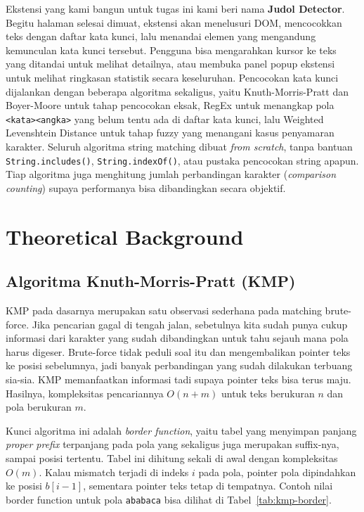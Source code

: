\documentclass[11pt,a4paper]{article}
\begin{document}
Ekstensi yang kami bangun untuk tugas ini kami beri nama \textbf{Judol Detector}. Begitu halaman selesai dimuat, ekstensi akan
menelusuri DOM, mencocokkan teks dengan daftar kata kunci, lalu menandai elemen yang mengandung kemunculan kata kunci tersebut.
Pengguna bisa mengarahkan kursor ke teks yang ditandai untuk melihat detailnya, atau membuka panel popup ekstensi untuk melihat
ringkasan statistik secara keseluruhan. Pencocokan kata kunci dijalankan dengan beberapa algoritma sekaligus, yaitu Knuth-Morris-Pratt
dan Boyer-Moore untuk tahap pencocokan eksak, RegEx untuk menangkap pola \texttt{<kata><angka>} yang belum tentu ada di daftar kata kunci,
lalu Weighted Levenshtein Distance untuk tahap fuzzy yang menangani kasus penyamaran karakter. Seluruh algoritma string matching
dibuat \textit{from scratch}, tanpa bantuan \texttt{String.includes()}, \texttt{String.indexOf()}, atau pustaka pencocokan string apapun.
Tiap algoritma juga menghitung jumlah perbandingan karakter (\textit{comparison counting}) supaya performanya bisa dibandingkan secara
objektif.

\newpage
\section{Theoretical Background}

\subsection{Algoritma Knuth-Morris-Pratt (KMP)}
KMP pada dasarnya merupakan satu observasi sederhana pada matching brute-force. Jika pencarian gagal di tengah jalan, sebetulnya kita
sudah punya cukup informasi dari karakter yang sudah dibandingkan untuk tahu sejauh mana pola harus digeser. Brute-force tidak
peduli soal itu dan mengembalikan pointer teks ke posisi sebelumnya, jadi banyak perbandingan yang sudah dilakukan terbuang sia-sia.
KMP memanfaatkan informasi tadi supaya pointer teks bisa terus maju. Hasilnya, kompleksitas pencariannya $O(n+m)$ untuk teks
berukuran $n$ dan pola berukuran $m$.

Kunci algoritma ini adalah \textit{border function}, yaitu tabel yang menyimpan
panjang \textit{proper prefix} terpanjang pada pola yang sekaligus juga merupakan suffix-nya, sampai posisi tertentu. Tabel ini
dihitung sekali di awal dengan kompleksitas $O(m)$. Kalau mismatch terjadi di indeks $i$ pada pola, pointer pola dipindahkan ke
posisi $b[i-1]$, sementara pointer teks tetap di tempatnya. Contoh nilai border function untuk pola \texttt{ababaca} bisa dilihat
di Tabel~\ref{tab:kmp-border}.
\end{document}
